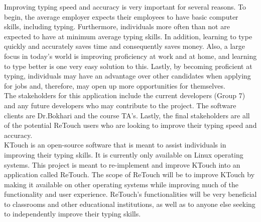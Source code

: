 \documentclass[12pt, oneside]{article}
\begin{document}
Improving typing speed and accuracy is very important for several reasons. To begin, the average employer expects their employees to have basic computer skills, including typing. Furthermore, individuals more often than not are expected to have at minimum average typing skills. In addition, learning to type quickly and accurately saves time and consequently saves money. Also, a large focus in today's world is improving proficiency at work and at home, and learning to type better is one very easy solution to this. Lastly, by becoming proficient at typing, individuals may have an advantage over other candidates when applying for jobs and, therefore, may open up more opportunities for themselves.
\\


The stakeholders for this application include the current developers (Group 7) and any future developers who may contribute to the project. The software clients are Dr.Bokhari and the course TA's. Lastly, the final stakeholders are all of the potential ReTouch users who are looking to improve their typing speed and accuracy. 
\\

KTouch is an open-source software that is meant to assist individuals in improving their typing skills. It is currently only available on Linux operating systems. This project is meant to re-implement and improve KTouch into an application called ReTouch. The scope of ReTouch will be to improve KTouch by making it available on other operating systems while improving much of the functionality and user experience. ReTouch's functionalities will be very beneficial to classrooms and other educational institutions, as well as to anyone else seeking to independently improve their typing skills.
\end{document}
